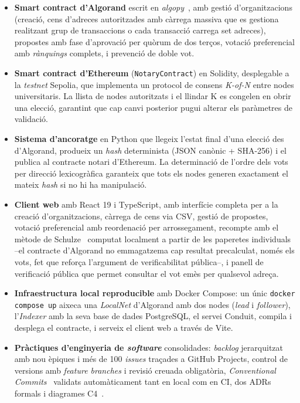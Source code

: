 \begin{itemize}
    \item \textbf{Smart contract d'Algorand} escrit en \emph{algopy}~\cite{algorandfoundation2024puya}, amb gestió
    d'organitzacions (creació, cens d'adreces autoritzades amb càrrega massiva que es gestiona realitzant grup de
    transaccions o cada transacció carrega set adreces), propostes amb fase d'aprovació per quòrum de dos terços,
    votació preferencial amb \emph{rànquings} complets, i prevenció de doble vot.

    \item \textbf{Smart contract d'Ethereum} (\texttt{NotaryContract}) en Solidity, desplegable a la \emph{testnet}
    Sepolia, que implementa un protocol de consens \textit{K-of-N} entre nodes universitaris.
    La llista de nodes autoritzats i el llindar K es congelen en obrir una elecció, garantint que cap canvi posterior
    pugui alterar els paràmetres de validació.

    \item \textbf{Sistema d'ancoratge} en Python que llegeix l'estat final d'una elecció des d'Algorand, produeix un
    \textit{hash} determinista (\ac{JSON} canònic + \ac{SHA}-256) i el publica al contracte notari d'Ethereum.
    La determinació de l'ordre dels vots per direcció lexicogràfica garanteix que tots els nodes generen exactament el
    mateix \textit{hash} si no hi ha manipulació.

    \item \textbf{Client web} amb React 19 i TypeScript, amb interfície completa per a la creació d'organitzacions,
    càrrega de cens via \ac{CSV}, gestió de propostes, votació preferencial amb reordenació per arrossegament, recompte
    amb el mètode de Schulze~\cite{schulze2011newmethod} computat localment a partir de les paperetes individuals --el
    contracte d'Algorand no emmagatzema cap resultat precalculat, només els vots, fet que reforça l'argument de
    verificabilitat pública--, i panell de verificació pública que permet consultar el vot emès per qualsevol adreça.

    \item \textbf{Infraestructura local reproducible} amb Docker Compose: un únic \texttt{docker compose up} aixeca una
    \emph{LocalNet} d'Algorand amb dos nodes (\emph{lead} i \emph{follower}), l'\emph{Indexer} amb la seva base de dades
    PostgreSQL, el servei Conduit, compila i desplega el contracte, i serveix el client web a través de Vite.

    \item \textbf{Pràctiques d'enginyeria de \textit{software}} consolidades: \emph{backlog} jerarquitzat amb nou
    èpiques i més de 100 \emph{issues} traçades a GitHub Projects, control de versions amb \emph{feature branches} i
    revisió creuada obligatòria, \emph{Conventional Commits}~\cite{conventionalcommits} validats automàticament tant en
    local com en \ac{CI}, dos \aclp{ADR} formals i diagrames C4~\cite{brown2018c4}.
\end{itemize}

